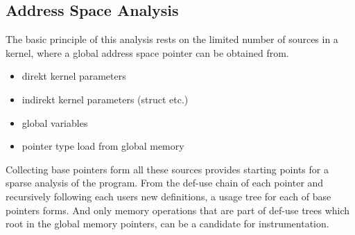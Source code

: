 \subsection{Address Space Analysis}\label{pa}
The basic principle of this analysis rests on the limited number of sources in 
a kernel, where a global address space pointer can be obtained from.
\begin{itemize}
	\item direkt kernel parameters
	\item indirekt kernel parameters (struct etc.)
	\item global variables
	\item pointer type load from global memory
\end{itemize}
Collecting base pointers form all these sources provides starting points for a sparse analysis of the program. From the def-use chain of each pointer and recursively following each users new definitions, a usage tree for each of base pointers forms. And only memory operations that are part of def-use trees which root in the global memory pointers, can be a candidate for instrumentation.




